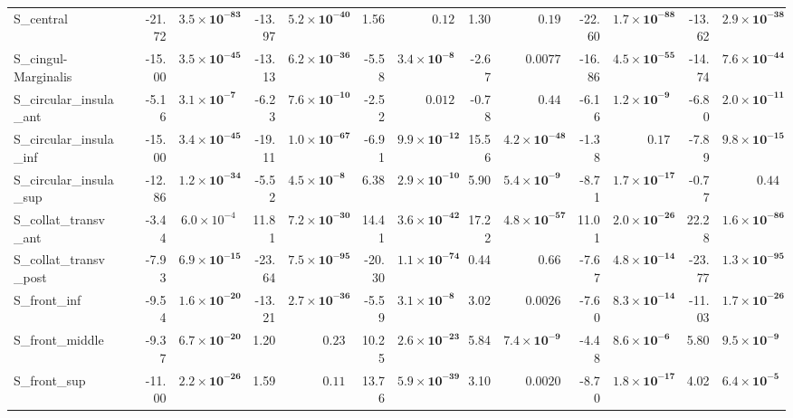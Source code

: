 {\begin{longtable}{llrrrrrrrrrrrr}
S\_central &  & -21.72 & $\mathbf{3.5{\times}10^{-83}}$ & -13.97 & $\mathbf{5.2{\times}10^{-40}}$ & 1.56 & $0.12$ & 1.30 & $0.19$ & -22.60 & $\mathbf{1.7{\times}10^{-88}}$ & -13.62 & $\mathbf{2.9{\times}10^{-38}}$ \\
S\_cingul-Marginalis &  & -15.00 & $\mathbf{3.5{\times}10^{-45}}$ & -13.13 & $\mathbf{6.2{\times}10^{-36}}$ & -5.58 & $\mathbf{3.4{\times}10^{-8}}$ & -2.67 & $0.0077$ & -16.86 & $\mathbf{4.5{\times}10^{-55}}$ & -14.74 & $\mathbf{7.6{\times}10^{-44}}$ \\
S\_circular\_insula\_ant &  & -5.16 & $\mathbf{3.1{\times}10^{-7}}$ & -6.23 & $\mathbf{7.6{\times}10^{-10}}$ & -2.52 & $0.012$ & -0.78 & $0.44$ & -6.16 & $\mathbf{1.2{\times}10^{-9}}$ & -6.80 & $\mathbf{2.0{\times}10^{-11}}$ \\
S\_circular\_insula\_inf &  & -15.00 & $\mathbf{3.4{\times}10^{-45}}$ & -19.11 & $\mathbf{1.0{\times}10^{-67}}$ & -6.91 & $\mathbf{9.9{\times}10^{-12}}$ & 15.56 & $\mathbf{4.2{\times}10^{-48}}$ & -1.38 & $0.17$ & -7.89 & $\mathbf{9.8{\times}10^{-15}}$ \\
S\_circular\_insula\_sup &  & -12.86 & $\mathbf{1.2{\times}10^{-34}}$ & -5.52 & $\mathbf{4.5{\times}10^{-8}}$ & 6.38 & $\mathbf{2.9{\times}10^{-10}}$ & 5.90 & $\mathbf{5.4{\times}10^{-9}}$ & -8.71 & $\mathbf{1.7{\times}10^{-17}}$ & -0.77 & $0.44$ \\
S\_collat\_transv\_ant &  & -3.44 & $6.0{\times}10^{-4}$ & 11.81 & $\mathbf{7.2{\times}10^{-30}}$ & 14.41 & $\mathbf{3.6{\times}10^{-42}}$ & 17.22 & $\mathbf{4.8{\times}10^{-57}}$ & 11.01 & $\mathbf{2.0{\times}10^{-26}}$ & 22.28 & $\mathbf{1.6{\times}10^{-86}}$ \\
S\_collat\_transv\_post &  & -7.93 & $\mathbf{6.9{\times}10^{-15}}$ & -23.64 & $\mathbf{7.5{\times}10^{-95}}$ & -20.30 & $\mathbf{1.1{\times}10^{-74}}$ & 0.44 & $0.66$ & -7.67 & $\mathbf{4.8{\times}10^{-14}}$ & -23.77 & $\mathbf{1.3{\times}10^{-95}}$ \\
S\_front\_inf &  & -9.54 & $\mathbf{1.6{\times}10^{-20}}$ & -13.21 & $\mathbf{2.7{\times}10^{-36}}$ & -5.59 & $\mathbf{3.1{\times}10^{-8}}$ & 3.02 & $0.0026$ & -7.60 & $\mathbf{8.3{\times}10^{-14}}$ & -11.03 & $\mathbf{1.7{\times}10^{-26}}$ \\
S\_front\_middle &  & -9.37 & $\mathbf{6.7{\times}10^{-20}}$ & 1.20 & $0.23$ & 10.25 & $\mathbf{2.6{\times}10^{-23}}$ & 5.84 & $\mathbf{7.4{\times}10^{-9}}$ & -4.48 & $\mathbf{8.6{\times}10^{-6}}$ & 5.80 & $\mathbf{9.5{\times}10^{-9}}$ \\
S\_front\_sup &  & -11.00 & $\mathbf{2.2{\times}10^{-26}}$ & 1.59 & $0.11$ & 13.76 & $\mathbf{5.9{\times}10^{-39}}$ & 3.10 & $0.0020$ & -8.70 & $\mathbf{1.8{\times}10^{-17}}$ & 4.02 & $\mathbf{6.4{\times}10^{-5}}$ \\

\end{longtable}}
